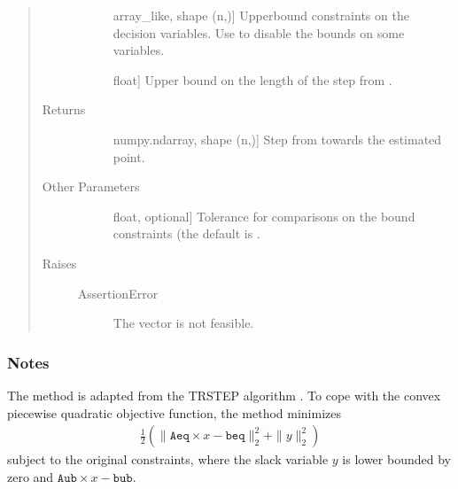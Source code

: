 \documentclass[letterpaper,10pt,english]{sphinxmanual}
\begin{document}
\begin{fulllineitems}
\begin{quote}
\begin{description}
\begin{description}
\item[{}] \leavevmode{[}array\_like, shape (n,){]}
\sphinxAtStartPar
Upper\sphinxhyphen{}bound constraints on the decision variables. Use  to
disable the bounds on some variables.

\item[{}] \leavevmode{[}float{]}
\sphinxAtStartPar
Upper bound on the length of the step from .

\end{description}

\item[{Returns}] \leavevmode\begin{description}
\item[{}] \leavevmode{[}numpy.ndarray, shape (n,){]}
\sphinxAtStartPar
Step from  towards the estimated point.

\end{description}

\item[{Other Parameters}] \leavevmode\begin{description}
\item[{}] \leavevmode{[}float, optional{]}
\sphinxAtStartPar
Tolerance for comparisons on the bound constraints (the default is
.

\end{description}

\item[{Raises}] \leavevmode\begin{description}
\item[{AssertionError}] \leavevmode
\sphinxAtStartPar
The vector  is not feasible.

\end{description}

\end{description}\end{quote}
\subsubsection*{Notes}

\sphinxAtStartPar
The method is adapted from the TRSTEP algorithm . To cope with the
convex piecewise quadratic objective function, the method minimizes
\begin{equation*}
\begin{split}\frac{1}{2} ( \| \mathtt{Aeq} \times x - \mathtt{beq} \|_2^2 +
\| y \|_2^2 )\end{split}
\end{equation*}
\sphinxAtStartPar
subject to the original constraints, where the slack variable \(y\) is
lower bounded by zero and \(\mathtt{Aub} \times x - \mathtt{bub}\).

\end{fulllineitems}
\end{document}

